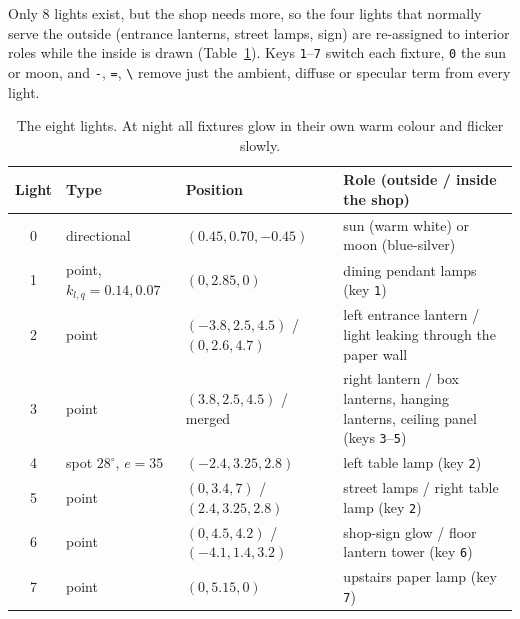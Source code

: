 \documentclass[10pt,a4paper]{article}
\newcommand{\code}[1]{\texttt{\small #1}}
\begin{document}
Only 8 lights exist, but the shop needs more, so the four lights that normally serve the outside (entrance lanterns, street lamps, sign) are re-assigned to interior roles while the inside is drawn (Table~\ref{tab:lights}). Keys \code{1}--\code{7} switch each fixture, \code{0} the sun or moon, and \code{-}, \code{=}, \code{\textbackslash} remove just the ambient, diffuse or specular term from every light.
\begin{table}[htbp]
\centering\footnotesize
\begin{tabular}{@{}clp{3.9cm}p{6.5cm}@{}}
\toprule
\textbf{Light} & \textbf{Type} & \textbf{Position} & \textbf{Role (outside / inside the shop)}\\
\midrule
0 & directional & $(0.45,0.70,-0.45)$ & sun (warm white) or moon (blue-silver)\\
1 & point, $k_{l,q}=0.14,0.07$ & $(0,2.85,0)$ & dining pendant lamps (key \code{1})\\
2 & point & $(-3.8,2.5,4.5)$ / $(0,2.6,4.7)$ & left entrance lantern / light leaking through the paper wall\\
3 & point & $(3.8,2.5,4.5)$ / merged & right lantern / box lanterns, hanging lanterns, ceiling panel (keys \code{3}--\code{5})\\
4 & spot $28^\circ$, $e=35$ & $(-2.4,3.25,2.8)$ & left table lamp (key \code{2})\\
5 & point & $(0,3.4,7)$ / $(2.4,3.25,2.8)$ & street lamps / right table lamp (key \code{2})\\
6 & point & $(0,4.5,4.2)$ / $(-4.1,1.4,3.2)$ & shop-sign glow / floor lantern tower (key \code{6})\\
7 & point & $(0,5.15,0)$ & upstairs paper lamp (key \code{7})\\
\bottomrule
\end{tabular}
\caption{The eight lights. At night all fixtures glow in their own warm colour and flicker slowly.}\label{tab:lights}
\end{table}
\end{document}
